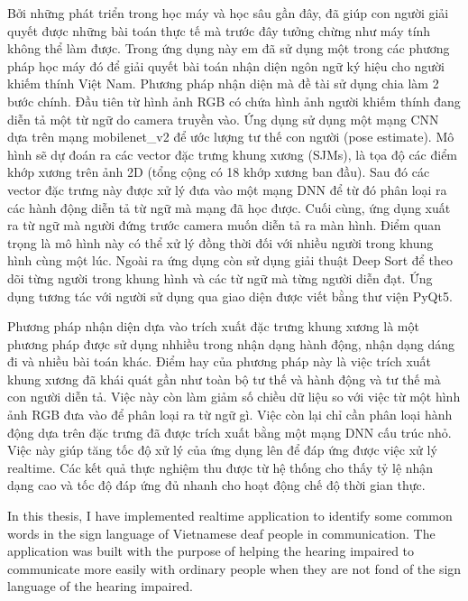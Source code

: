 Bởi những phát triển trong học máy và học sâu gần đây, đã giúp con người giải quyết được những bài toán thực tế mà trước đây tưởng chừng như máy tính không thể làm được. Trong ứng dụng này em đã sử dụng một trong các phương pháp học máy đó để giải quyết bài toán nhận diện ngôn ngữ ký hiệu cho người khiếm thính Việt Nam. Phương pháp nhận diện mà đề tài sử dụng chia làm 2 bước chính. Đầu tiên từ hình ảnh RGB có chứa hình ảnh người khiếm thính đang diễn tả một từ ngữ do camera truyền vào. Ứng dụng sử dụng một mạng CNN dựa trên mạng mobilenet\_v2 để ước lượng tư thế con người (pose estimate). Mô hình sẽ dự đoán ra các vector đặc trưng khung xương (SJMs), là tọa độ các điểm khớp xương trên ảnh 2D (tổng cộng có 18 khớp xương ban đầu). Sau đó các vector đặc trưng này được xử lý đưa vào một mạng DNN để từ đó phân loại ra các hành động diễn tả từ ngữ mà mạng đã học được. Cuối cùng, ứng dụng xuất ra từ ngữ mà người đứng trước camera muốn diễn tả ra màn hình. Điểm quan trọng là mô hình này có thể xử lý đồng thời đối với nhiều người trong khung hình cùng một lúc. Ngoài ra ứng dụng còn sử dụng giải thuật Deep Sort để theo dõi từng người trong khung hình và các từ ngữ mà từng người diễn đạt. Ứng dụng tương tác với người sử dụng qua giao diện được viết bằng thư viện PyQt5. 

Phương pháp nhận diện dựa vào trích xuất đặc trưng khung xương là một phương pháp được sử dụng nhhiều trong nhận dạng hành động, nhận dạng dáng đi và nhiều bài toán khác. Điểm hay của phương pháp này là việc trích xuất khung xương đã khái quát gần như toàn bộ tư thế và hành động và tư thế mà con người diễn tả. Việc này còn làm giảm số chiều dữ liệu so với việc từ một hình ảnh RGB đưa vào để phân loại ra từ ngữ gì. Việc còn lại chỉ cần phân loại hành động dựa trên đặc trưng đã được trích xuất bằng một mạng DNN cấu trúc nhỏ. Việc này giúp tăng tốc độ xử lý của ứng dụng lên để đáp ứng được việc xử lý realtime. Các kết quả thực nghiệm thu được từ hệ thống cho thấy tỷ lệ nhận dạng cao và tốc độ đáp ứng đủ nhanh cho hoạt động chế độ thời gian thực.

\newpage
\thispagestyle{abstract}
\begin{center}
{}
\end{center}
In this thesis, I have implemented realtime application to identify some common words in the sign language of Vietnamese deaf people in communication. The application was built with the purpose of helping the hearing impaired to communicate more easily with ordinary people when they are not fond of the sign language of the hearing impaired.

